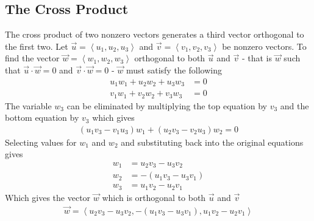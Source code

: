 \documentclass[a4paper]{article}
\newcommand{\la}{\left\langle}
\newcommand{\ra}{\right\rangle}
\newcommand{\ih}{\hat{\imath}}
\newcommand{\jh}{\hat{\jmath}}
\newcommand{\kh}{\hat{k}}
\begin{document}
\subsection{The Cross Product}
The cross product of two nonzero vectors generates a third vector orthogonal to the first two. Let $\vec{u} = \la u_1, u_2, u_3 \ra$ and $\vec{v} = \la v_1, v_2, v_3 \ra$ be nonzero vectors. To find the vector $\vec{w} = \la w_1, w_2, w_3 \ra$ orthogonal to both $\vec{u}$ and $\vec{v}$ - that is $\vec{w}$ such that $\vec{u} \cdot \vec{w} = 0$ and $\vec{v} \cdot \vec{w} = 0$ - $\vec{w}$ must satisfy the following
\begin{align*}
    u_1w_1 + u_2w_2 + u_3w_3 &= 0 \\
    v_1w_1 + v_2w_2 + v_3w_3 &= 0
\end{align*}
The variable $w_3$ can be eliminated by multiplying the top equation by $v_3$ and the bottom equation by $v_3$ which gives
\begin{align*}
    (u_1v_3 - v_1u_3)w_1 + (u_2v_3 - v_2u_3)w_2 = 0
\end{align*}
Selecting values for $w_1$ and $w_2$ and substituting back into the original equations gives
\begin{align*}
    w_1 &= u_2v_3 - u_3v_2 \\
    w_2 &= -(u_1v_3 - u_3v_1) \\
    w_3 &= u_1v_2 - u_2v_1
\end{align*}
Which gives the vector $\vec{w}$ which is orthogonal to both $\vec{u}$ and $\vec{v}$
\begin{align*}
    \vec{w} = \la u_2v_3 - u_3v_2, -(u_1v_3 - u_3v_1), u_1v_2 - u_2v_1 \ra
\end{align*}
\begin{center}
\end{center}
\end{document}
